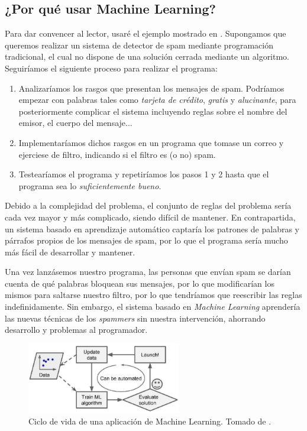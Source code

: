 \documentclass[../main.tex]{subfiles}
\begin{document}
\subsection{¿Por qué usar Machine Learning?}

Para dar convencer al lector, usaré el ejemplo mostrado en \cite{Geron2019}. Supongamos que queremos realizar un sistema de detector de spam mediante programación tradicional, el cual no dispone de una solución cerrada mediante un algoritmo. Seguiríamos el siguiente proceso para realizar el programa:

\begin{enumerate}
    \item Analizaríamos los rasgos que presentan los mensajes de spam. Podríamos empezar con palabras tales como \textit{tarjeta de crédito}, \textit{gratis} y \textit{ alucinante}, para posteriormente complicar el sistema incluyendo reglas sobre el nombre del emisor, el cuerpo del mensaje...
    \item Implementaríamos dichos rasgos en un programa que tomase un correo y ejerciese de filtro, indicando si el filtro es (o no) spam.
    \item Testearíamos el programa y repetiríamos los pasos 1 y 2 hasta que el programa sea lo \textit{suficientemente bueno}.
\end{enumerate}

Debido a la complejidad del problema, el conjunto de reglas del problema sería cada vez mayor y más complicado, siendo difícil de mantener. En contrapartida, un sistema basado en aprendizaje automático captaría los patrones de palabras y párrafos propios de los mensajes de spam, por lo que el programa sería mucho más fácil de desarrollar y mantener.\newline

Una vez lanzásemos nuestro programa, las personas que envían spam se darían cuenta de qué palabras bloquean sus mensajes, por lo que modificarían los mismos para saltarse nuestro filtro, por lo que tendríamos que reescribir las reglas indefinidamente. Sin embargo, el sistema basado en \textit{Machine Learning} aprendería las nuevas técnicas de los \textit{spammers} sin nuestra intervención, ahorrando desarrollo y problemas al programador. \newline

\begin{figure}[h]
    \centering
    \includegraphics[width=0.6\textwidth]{imagenes/Ciclo vida ML.png}
    \caption[Ciclo de vida de una aplicación de Machine Learning.]{Ciclo de vida de una aplicación de Machine Learning. Tomado de \cite{Geron2019}.}
    \label{fig:ciclo_vida_ml}
\end{figure}
\end{document}
